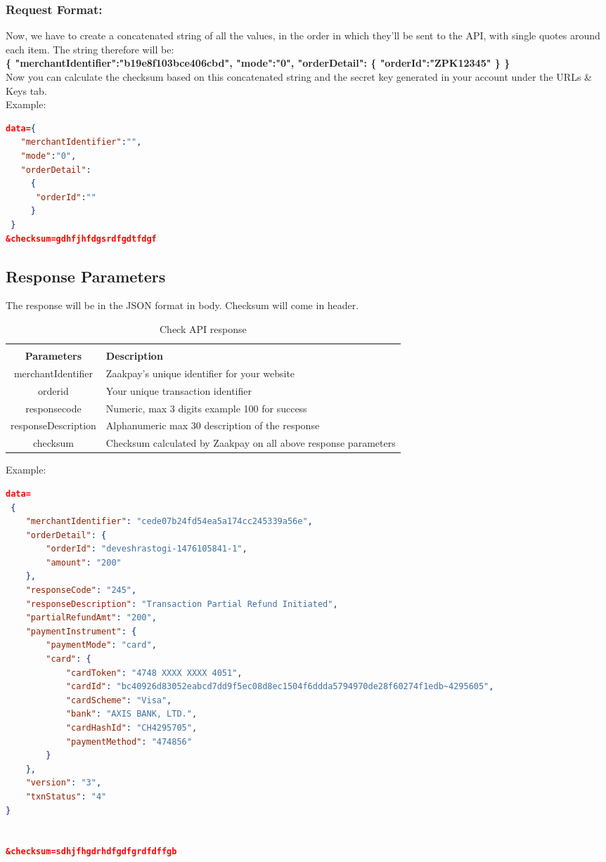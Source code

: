 \documentclass{article}
\begin{document}
\subsubsection{Request Format:}
Now, we have to create a concatenated string of all the values, in the order in which they'll be sent to the API, with single quotes around each item. The string therefore will be: \\
{\bfseries \textquotesingle{} \{ "merchantIdentifier":"b19e8f103bce406cbd",
 "mode":"0",
 "orderDetail":
 \{ "orderId":"ZPK12345"
 \}
 \} \textquotesingle{}} \\
Now you can calculate the checksum based on this concatenated string and the secret key
generated in your account under the URLs \& Keys tab.\\
Example: \\
\begin{lstlisting}[language=json,breaklines=true]
data={
   "merchantIdentifier":"",
   "mode":"0",
   "orderDetail":
     {
      "orderId":""
     }
 }
&checksum=gdhfjhfdgsrdfgdtfdgf
\end{lstlisting}

\subsection{Response Parameters}
The response will be in the JSON format in body. Checksum will come in header.
\begin{longtable}{||c|| p{12.5cm}||}
\rowcolor{white}
\caption{Check API response}\\
\rowcolor{green!50}
\bfseries{Parameters} & \bfseries{Description} \\ \hline
merchantIdentifier & Zaakpay's unique identifier for your website \\
orderid & Your unique transaction identifier\\
responsecode &Numeric, max 3 digits example 100 for success \\
responseDescription &Alphanumeric max 30 description of the response \\
checksum &Checksum calculated by Zaakpay on all above response parameters \\



\end{longtable}
\newpage
Example:

\begin{lstlisting}[language=json,breaklines=true]
data=
 {
	"merchantIdentifier": "cede07b24fd54ea5a174cc245339a56e",
	"orderDetail": {
		"orderId": "deveshrastogi-1476105841-1",
		"amount": "200"
	},
	"responseCode": "245",
	"responseDescription": "Transaction Partial Refund Initiated",
	"partialRefundAmt": "200",
	"paymentInstrument": {
		"paymentMode": "card",
		"card": {
			"cardToken": "4748 XXXX XXXX 4051",
			"cardId": "bc40926d83052eabcd7dd9f5ec08d8ec1504f6ddda5794970de28f60274f1edb~4295605",
			"cardScheme": "Visa",
			"bank": "AXIS BANK, LTD.",
			"cardHashId": "CH4295705",
			"paymentMethod": "474856"
		}
	},
	"version": "3",
	"txnStatus": "4"
}


&checksum=sdhjfhgdrhdfgdfgrdfdffgb
\end{lstlisting}
\end{document}
